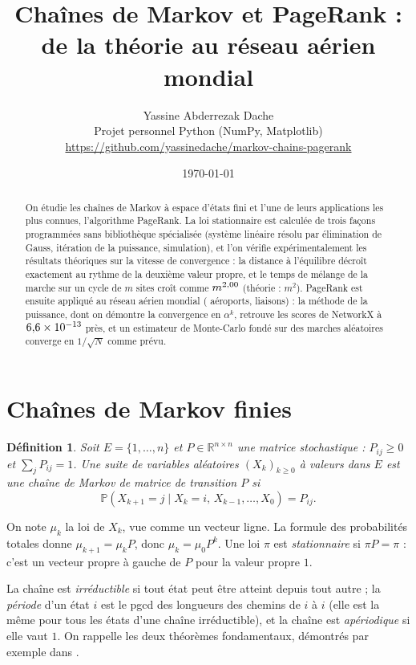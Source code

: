 \documentclass[11pt,a4paper]{article}
\title{\textbf{Chaînes de Markov et PageRank :\\ de la théorie au réseau aérien mondial}}
\author{Yassine Abderrezak Dache\\[2pt]\small Projet personnel \textendash{} Python (NumPy, Matplotlib)\\[1pt]\small\url{https://github.com/yassinedache/markov-chains-pagerank}}
\date{\today}
\newtheorem{definition}{Définition}
\theoremstyle{remark}
\newcommand{\R}{\mathbb{R}}
\newcommand{\1}{\mathbf{1}}
\newcommand{\PP}{\mathbb{P}}
\begin{document}
\maketitle

\begin{abstract}
On étudie les chaînes de Markov à espace d'états fini et l'une de leurs applications les plus connues, l'algorithme PageRank. La loi stationnaire est calculée de trois façons programmées sans bibliothèque spécialisée (système linéaire résolu par élimination de Gauss, itération de la puissance, simulation), et l'on vérifie expérimentalement les résultats théoriques sur la vitesse de convergence : la distance à l'équilibre décroît exactement au rythme de la deuxième valeur propre, et le temps de mélange de la marche sur un cycle de $m$ sites croît comme $m^{2{,}00}$ (théorie : $m^2$). PageRank est ensuite appliqué au réseau aérien mondial (\nAirports{} aéroports, \nRoutes{} liaisons) : la méthode de la puissance, dont on démontre la convergence en $\alpha^k$, retrouve les scores de NetworkX à $6{,}6 \times 10^{-13}$ près, et un estimateur de Monte-Carlo fondé sur des marches aléatoires converge en $1/\sqrt N$ comme prévu.
\end{abstract}

\section{Chaînes de Markov finies}

\begin{definition}
Soit $E = \{1, \dots, n\}$ et $P \in \R^{n\times n}$ une matrice \emph{stochastique} : $P_{ij} \ge 0$ et $\sum_j P_{ij} = 1$. Une suite de variables aléatoires $(X_k)_{k\ge0}$ à valeurs dans $E$ est une chaîne de Markov de matrice de transition $P$ si
\[
  \PP(X_{k+1} = j \mid X_k = i,\, X_{k-1}, \dots, X_0) = P_{ij}.
\]
\end{definition}

On note $\mu_k$ la loi de $X_k$, vue comme un vecteur ligne. La formule des probabilités totales donne $\mu_{k+1} = \mu_k P$, donc $\mu_k = \mu_0 P^k$. Une loi $\pi$ est \emph{stationnaire} si $\pi P = \pi$ : c'est un vecteur propre à gauche de $P$ pour la valeur propre $1$.

La chaîne est \emph{irréductible} si tout état peut être atteint depuis tout autre ; la \emph{période} d'un état $i$ est le pgcd des longueurs des chemins de $i$ à $i$ (elle est la même pour tous les états d'une chaîne irréductible), et la chaîne est \emph{apériodique} si elle vaut $1$. On rappelle les deux théorèmes fondamentaux, démontrés par exemple dans \cite{norris,lpw}.
\end{document}
